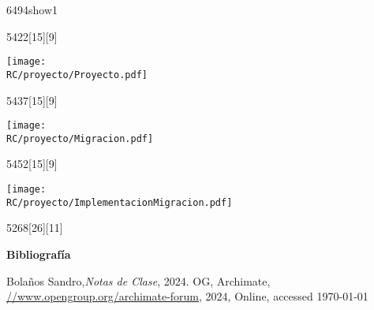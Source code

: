 \begin{NuevaPagina}{64}{94}{show1}
	\begin{NuevoParrafo}{54}{22}[15][9]
		\begin{Marco}[\LineaSupC][\LineaInfC][\LineaIzqC][\LineaDerC][CBlanco]
			\subseccionC{\PVPry}%
			\centering\texttt{[image: \\RC/proyecto/Proyecto.pdf]}
		\end{Marco}
	\end{NuevoParrafo}
	\begin{NuevoParrafo}{54}{37}[15][9]
		\begin{Marco}[\LineaSupC][\LineaInfC][\LineaIzqC][\LineaDerC][CBlanco]
			\subseccionC{\PVMig}%
			\centering\texttt{[image: \\RC/proyecto/Migracion.pdf]}
		\end{Marco}
	\end{NuevoParrafo}
	\begin{NuevoParrafo}{54}{52}[15][9]
		\begin{Marco}[\LineaSupC][\LineaInfC][\LineaIzqC][\LineaDerC][CBlanco]
			\subseccionC{\PVImM}%
			\centering\texttt{[image: \\RC/proyecto/ImplementacionMigracion.pdf]}
		\end{Marco}
	\end{NuevoParrafo}
	\begin{NuevoParrafo}{52}{68}[26][11]
		\begin{Marco}[\LineaSupC][\LineaInfC][\LineaIzqC][\LineaDerC][CBlanco]	
		 {\Large\centering \textbf{Bibliografía}}	
		 \vspace{-30pt} 
		 \renewcommand{\bibfont}{\normalfont\small}
		 \printbibliography[title={Libros/Artículos}]
		 \let\oldthebibliography=\thebibliography
		 \let\oldendthebibliography=\endthebibliography
		 \renewenvironment{thebibliography}[1]{
		 	\oldthebibliography{#1}
		 	\setcounter{enumiv}{1} %
		 }{\oldendthebibliography}
		 \begin{thebibliography}{9}		 	
		 	Bolaños Sandro,\textit{Notas de Clase}, 2024.
		 	{OG}, Archimate, \url{//www.opengroup.org/archimate-forum}, 2024, 
		 	Online, accessed \today		 	
		 \end{thebibliography}		
		\end{Marco}
	\end{NuevoParrafo}
	
\end{NuevaPagina}